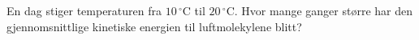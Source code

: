 %
En dag stiger temperaturen fra $10\,^\circ$C til $20\,^\circ$C. Hvor mange ganger større har den gjennomsnittlige kinetiske energien til luftmolekylene blitt?
%
